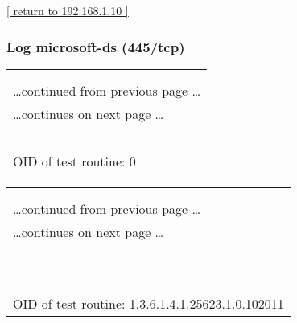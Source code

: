 \documentclass{article}
\begin{document}
\begin{footnotesize}\hyperref[host:192.168.1.10]{[ return to 192.168.1.10 ]}\end{footnotesize}
\subsubsection{Log microsoft-ds (445/tcp)}
\label{port:192.168.1.10 microsoft-ds (445/tcp) Log}

\begin{longtable}{|p{}|}
\hline
\rowcolor{openvas_log}{\color{white}{Log}}\\
\rowcolor{openvas_log}{\color{white}{NVT: }}\\
\hline
\endfirsthead
\hfill\ldots continued from previous page \ldots \\
\hline
\endhead
\hline
\ldots continues on next page \ldots \\
\endfoot
\hline
\endlastfoot
\\
\rowcolor{white}{\verb=Open port.=}\\
\rowcolor{white}{\verb==}\\
\rowcolor{white}{\verb==}\\
\\
OID of test routine: 0\\
\end{longtable}

\begin{longtable}{|p{}|}
\hline
\rowcolor{openvas_log}{\color{white}{Log (CVSS: 0.0) }}\\
\rowcolor{openvas_log}{\color{white}{NVT: SMB NativeLanMan}}\\
\hline
\endfirsthead
\hfill\ldots continued from previous page \ldots \\
\hline
\endhead
\hline
\ldots continues on next page \ldots \\
\endfoot
\hline
\endlastfoot
\\
\rowcolor{white}{\verb= Summary:=}\\
\rowcolor{white}{\verb= It is possible to extract OS, domain and SMB server information=}\\
\rowcolor{white}{\verb=from the Session Setup AndX Response packet which is generated=}\\
\rowcolor{white}{\verb=during NTLM authentication.Detected SMB workgroup: WORKGROUP=}\\
\rowcolor{white}{\verb=Detected SMB server: Samba 3.4.7=}\\
\rowcolor{white}{\verb=Detected OS: Unix=}\\
\rowcolor{white}{\verb==}\\
\rowcolor{white}{\verb==}\\
\\
OID of test routine: 1.3.6.1.4.1.25623.1.0.102011\\
\end{longtable}
\end{document}
